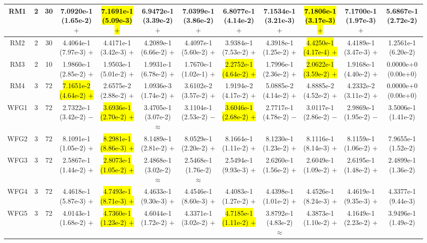 \documentclass[journal]{IEEEtran}
\begin{document}
\begin{table*}[htbp]
\begin{tabular}{cccccccccccc}
\hline
\multirow{1}{*}{RM1}&2&30&7.0920e-1 (1.65e-2) $+$&\hl{7.1691e-1 (5.09e-3) $+$}&6.9472e-1 (3.39e-2) $+$&7.0399e-1 (3.86e-2) $+$&6.8077e-1 (4.14e-2) $+$&7.1534e-1 (3.21e-3) $+$&\hl{7.1806e-1 (3.17e-3) $+$}&7.1700e-1 (1.97e-3) $+$&5.6867e-1 (2.72e-2)\\
\hline
\multirow{1}{*}{RM2}&2&30&4.4064e-1 (7.97e-3) $+$&4.4171e-1 (3.42e-3) $+$&4.2089e-1 (6.66e-2) $+$&4.4097e-1 (5.60e-2) $+$&3.9384e-1 (7.53e-2) $+$&4.3918e-1 (1.25e-2) $+$&\hl{4.4250e-1 (4.17e-4) $+$}&4.4189e-1 (3.47e-3) $+$&1.2561e-1 (6.20e-2)\\
\hline
\multirow{1}{*}{RM3}&2&10&1.9860e-1 (2.85e-2) $+$&1.9503e-1 (5.01e-2) $+$&1.9931e-1 (6.78e-2) $+$&1.7670e-1 (1.02e-1) $+$&\hl{2.2752e-1 (4.64e-2) $+$}&1.7996e-1 (2.36e-2) $+$&\hl{2.0622e-1 (3.59e-2) $+$}&1.9168e-1 (4.40e-2) $+$&0.0000e+0 (0.00e+0)\\
\hline
\multirow{1}{*}{RM4}&3&72&\hl{7.1651e-2 (4.64e-2) $+$}&2.6575e-2 (2.88e-2) $+$&1.0936e-3 (1.74e-2) $+$&3.6102e-2 (3.57e-2) $+$&1.9194e-2 (4.17e-2) $+$&5.0885e-2 (4.14e-2) $+$&4.8885e-2 (4.52e-2) $+$&4.2332e-2 (3.11e-2) $+$&0.0000e+0 (0.00e+0)\\
\hline
\multirow{1}{*}{WFG1}&3&72&2.7322e-1 (3.42e-2) $-$&\hl{3.6936e-1 (2.70e-2) $+$}&3.4705e-1 (3.07e-2) $\approx$&3.1104e-1 (2.53e-2) $-$&\hl{3.6046e-1 (2.68e-2) $+$}&2.7717e-1 (4.78e-2) $-$&3.0117e-1 (2.86e-2) $-$&2.9869e-1 (1.95e-2) $-$&3.5006e-1 (1.41e-2)\\
\hline
\multirow{1}{*}{WFG2}&3&72&8.1091e-1 (1.05e-2) $+$&\hl{8.2981e-1 (8.86e-3) $+$}&8.1489e-1 (2.81e-2) $+$&8.0529e-1 (2.20e-2) $+$&8.1664e-1 (1.11e-2) $+$&8.1230e-1 (1.23e-2) $+$&8.1116e-1 (8.14e-3) $+$&8.1159e-1 (1.06e-2) $+$&7.9655e-1 (1.52e-2)\\
\hline
\multirow{1}{*}{WFG3}&3&72&2.5867e-1 (1.44e-2) $+$&\hl{2.8073e-1 (1.05e-2) $+$}&2.4868e-1 (3.02e-2) $\approx$&2.5468e-1 (1.76e-2) $\approx$&2.5494e-1 (9.93e-3) $+$&2.6260e-1 (1.56e-2) $+$&2.6049e-1 (1.09e-2) $+$&2.6195e-1 (1.48e-2) $+$&2.4899e-1 (1.36e-2)\\
\hline
\multirow{1}{*}{WFG4}&3&72&4.4618e-1 (5.87e-3) $+$&\hl{4.7493e-1 (8.71e-3) $+$}&4.4633e-1 (9.30e-3) $+$&4.4546e-1 (8.60e-3) $+$&4.4083e-1 (1.27e-2) $+$&4.4398e-1 (1.01e-2) $+$&4.4526e-1 (8.24e-3) $+$&4.4619e-1 (9.35e-3) $+$&4.3377e-1 (9.44e-3)\\
\hline
\multirow{1}{*}{WFG5}&3&72&4.0143e-1 (1.68e-2) $+$&\hl{4.7360e-1 (1.23e-2) $+$}&4.6044e-1 (1.72e-2) $+$&4.3371e-1 (3.02e-2) $+$&\hl{4.7185e-1 (1.11e-2) $+$}&3.8792e-1 (4.83e-2) $\approx$&4.3873e-1 (1.10e-2) $+$&4.1649e-1 (2.23e-2) $+$&3.9496e-1 (1.49e-2)\\

\end{tabular}
\end{table*}
\end{document}
